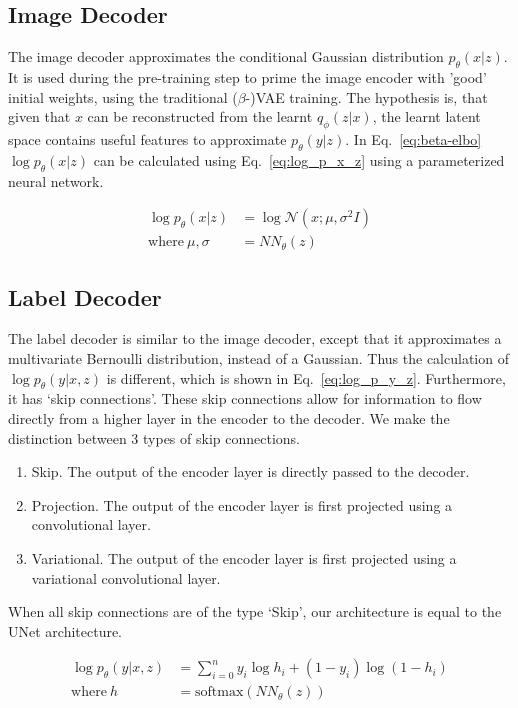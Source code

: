 \subsection{Image Decoder}
The image decoder approximates the conditional Gaussian distribution $p_\theta(x|z)$. It is used during the pre-training step to prime the image encoder with 'good' initial weights, using the traditional ($\beta$-)VAE training. The hypothesis is, that given that $x$ can be reconstructed from the learnt $q_\phi(z|x)$, the learnt latent space contains useful features to approximate $p_\theta(y|z)$. In Eq.~\ref{eq:beta-elbo} $\log p_\theta(x|z)$ can be calculated using Eq.~\ref{eq:log_p_x_z} using a parameterized neural network.

\begin{equation}
    \begin{split}
        \log p_\theta(x|z)      & = \log \mathcal{N}(x; \mu, \sigma^2I) \label{eq:log_p_x_z} \\
        \text{where}~\mu,\sigma & =NN_\theta(z)
    \end{split}
\end{equation}

\subsection{Label Decoder}
The label decoder is similar to the image decoder, except that it approximates a multivariate Bernoulli distribution, instead of a Gaussian. Thus the calculation of $\log p_\theta(y|x,z)$ is different, which is shown in Eq.~\ref{eq:log_p_y_z}. Furthermore, it has `skip connections'. These skip connections allow for information to flow directly from a higher layer in the encoder to the decoder. We make the distinction between 3 types of skip connections.
\begin{enumerate}
    \item Skip. The output of the encoder layer is directly passed to the decoder.
    \item Projection. The output of the encoder layer is first projected using a convolutional layer.
    \item Variational. The output of the encoder layer is first projected using a variational convolutional layer.
\end{enumerate}
When all skip connections are of the type `Skip', our architecture is equal to the UNet architecture.

\begin{subequations}
    \begin{align}
        \log p_\theta(y|x, z) & = \sum_{i=0}^n y_i \log h_i + (1 - y_i)\log(1-h_i) \label{eq:log_p_y_z} \\
        \text{where}~h        & = \text{softmax}(NN_\theta(z))
    \end{align}
\end{subequations}

